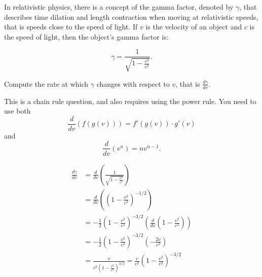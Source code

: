\documentclass{ximera}
\author{Emma Smith Zbarsky}
\begin{document}
\begin{exercise}

In relativistic physics, there is a concept of the gamma factor, denoted
by $\gamma$, that describes time dilation and length contraction when
moving at relativistic speeds, that is speeds close to the speed of
light. If $v$ is the velocity of an object and $c$ is the speed of
light, then the object's gamma factor is:

\[\gamma = \frac{1}{\sqrt{1-\frac{v^2}{c^2}}}.\]

Compute the rate at which $\gamma$ changes with respect to $v$, that is
$\frac{d\gamma}{dv}$.


\begin{hint}
This is a chain rule question, and also requires using the power rule.
You need to use both
\[\frac{d}{dv}\left(f\left(g(v)\right)\right) = f'\left(g(v)\right)\cdot g'(v)\]
and \[\frac{d}{dv}\left(v^n\right) = nv^{n-1}.\]
\end{hint}


\begin{hint}
\begin{align*}
\frac{d\gamma}{dv} &= \frac{d}{dv}\left(\frac{1}{\sqrt{1-\frac{v^2}{c^2}}}\right) \\
&= 
\frac{d}{dv}\left(\left(1-\frac{v^2}{c^2}\right)^{-1/2}\right) \\
&= -\frac{1}{2}\left(1-\frac{v^2}{c^2}\right)^{-3/2}\left(\frac{d}{dv}\left(1-\frac{v^2}{c^2}\right)\right) \\
&=  -\frac{1}{2}\left(1-\frac{v^2}{c^2}\right)^{-3/2}\left(-\frac{2v}{c^2}\right) \\
&= \frac{v}{c^2(1-\frac{v^2}{c^2})^{3/2}} = \boxed{\frac{v}{c^2}\left(1-\frac{v^2}{c^2}\right)^{-3/2}}
\end{align*}
\end{hint}


\begin{multipleChoice}
\end{multipleChoice}

\end{exercise}
\end{document}
